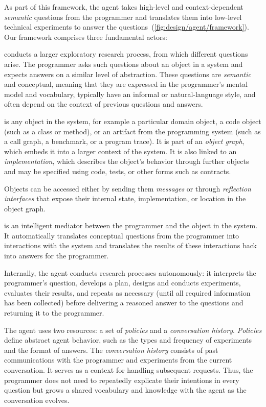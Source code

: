 As part of this framework, the agent takes high-level and context-dependent \emph{semantic} questions from the programmer and translates them into low-level technical experiments to answer the questions~(\cref{fig:design/agent/framework}).
Our framework comprises three fundamental actors:

\begin{description}[noextralabelsep]
	\item[The programmer] conducts a larger exploratory research process, from which different questions arise.
	The programmer asks such questions about an object in a system and expects answers on a similar level of abstraction.
	These questions are \emph{semantic} and conceptual, meaning that they are expressed in the programmer's mental model and vocabulary, typically have an informal or natural-language style, and often depend on the context of previous questions and answers.

	\item[The object] is any object in the system, for example a particular domain object, a code object (such as a class or method), or an artifact from the programming system (such as a call graph, a benchmark, or a program trace).
	It is part of an \emph{object graph}, which embeds it into a larger context of the system.
	It is also linked to an \emph{implementation}, which describes the object's behavior through further objects and may be specified using code, tests, or other forms such as contracts.

	Objects can be accessed either by sending them \emph{messages} or through \emph{reflection interfaces} that expose their internal state, implementation, or location in the object graph.

	\item[The exploratory programming agent] is an intelligent mediator between the programmer and the object in the system.
	It automatically translates conceptual questions from the programmer into interactions with the system and translates the results of these interactions back into answers for the programmer.

	Internally, the agent conducts research processes autonomously: it interprets the programmer's question, develops a plan, designs and conducts experiments, evaluates their results, and repeats as necessary (until all required information has been collected) before delivering a reasoned answer to the questions and returning it to the programmer.

	The agent uses two resources: a set of \emph{policies} and a \emph{conversation history}.
	\emph{Policies} define abstract agent behavior, such as the types and frequency of experiments and the format of answers.
	The \emph{conversation history} consists of past communications with the programmer and experiments from the current conversation.
	It serves as a context for handling subsequent requests.
	Thus, the programmer does not need to repeatedly explicate their intentions in every question but grows a shared vocabulary and knowledge with the agent as the conversation evolves.
\end{description}

